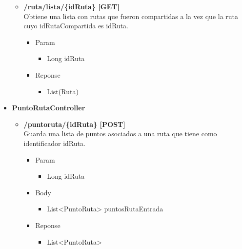 \begin{itemize}
\begin{itemize}
\item  \textbf{/ruta/lista/\{idRuta\} [GET]}\\
Obtiene una lista con rutas que fueron compartidas a la vez que la ruta cuyo idRutaCompartida es idRuta.
\begin{itemize}
\item Param
\begin{itemize}
\item Long idRuta
\end{itemize}
\item Reponse
\begin{itemize}
\item List(Ruta)
\end{itemize}
\end{itemize}
\end{itemize}




% 
\item \textbf{PuntoRutaController}


\begin{itemize}
\item \textbf{ /puntoruta/\{idRuta\} [POST]}\\
Guarda una lista de puntos asociados a una ruta que tiene como identificador idRuta.
\begin{itemize}
\item Param
\begin{itemize}
\item Long idRuta
\end{itemize}
\item Body
\begin{itemize}
\item List<PuntoRuta> puntosRutaEntrada
\end{itemize}
\item Reponse
\begin{itemize}
\item List<PuntoRuta>
\end{itemize}
\end{itemize}
\end{itemize}
\end{itemize}

